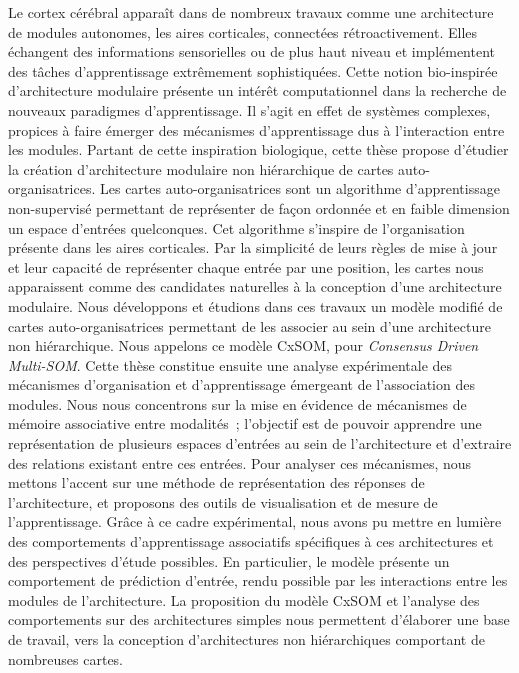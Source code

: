 \documentclass[11pt]{thesul-cs}
\begin{document}
\dominitoc

\begin{ThesisAbstract}
  \begin{FrenchAbstract}
Le cortex cérébral apparaît dans de nombreux travaux comme une architecture de modules autonomes, les aires corticales, connectées rétroactivement. Elles échangent des informations sensorielles ou de plus haut niveau et implémentent des tâches d'apprentissage extrêmement sophistiquées. Cette notion bio-inspirée d'architecture modulaire présente un intérêt computationnel dans la recherche de nouveaux paradigmes d'apprentissage. Il s'agit en effet de systèmes complexes, propices à faire émerger des mécanismes d'apprentissage dus à l'interaction entre les modules.
Partant de cette inspiration biologique, cette thèse propose d'étudier la création d'architecture modulaire non hiérarchique de cartes auto-organisatrices.
Les cartes auto-organisatrices sont un algorithme d'apprentissage non-supervisé permettant de représenter de façon ordonnée et en faible dimension un espace d'entrées quelconques. Cet algorithme s'inspire de l'organisation présente dans les aires corticales. 
Par la simplicité de leurs règles de mise à jour et leur capacité de représenter chaque entrée par une position, les cartes nous apparaissent comme des candidates naturelles à la conception d'une architecture modulaire.
Nous développons et étudions dans ces travaux un modèle modifié de cartes auto-organisatrices permettant de les associer au sein d'une architecture non hiérarchique. Nous appelons ce modèle CxSOM, pour \emph{Consensus Driven Multi-SOM}.
Cette thèse constitue ensuite une analyse expérimentale des mécanismes d'organisation et d'apprentissage émergeant de l'association des modules. Nous nous concentrons sur la mise en évidence de mécanismes de mémoire associative entre modalités~; l'objectif est de pouvoir apprendre une représentation de plusieurs espaces d'entrées au sein de l'architecture et d'extraire des relations existant entre ces entrées.
Pour analyser ces mécanismes, nous mettons l'accent sur une méthode de représentation des réponses de l'architecture, et proposons des outils de visualisation et de mesure de l'apprentissage. Grâce à ce cadre expérimental, nous avons pu mettre en lumière des comportements d'apprentissage associatifs spécifiques à ces architectures et des perspectives d'étude possibles.
En particulier, le modèle présente un comportement de prédiction d'entrée, rendu possible par les interactions entre les modules de l'architecture.
La proposition du modèle CxSOM et l'analyse des comportements sur des architectures simples nous permettent d'élaborer une base de travail, vers la conception d'architectures non hiérarchiques comportant de nombreuses cartes.


\end{FrenchAbstract}
\end{ThesisAbstract}
\end{document}
